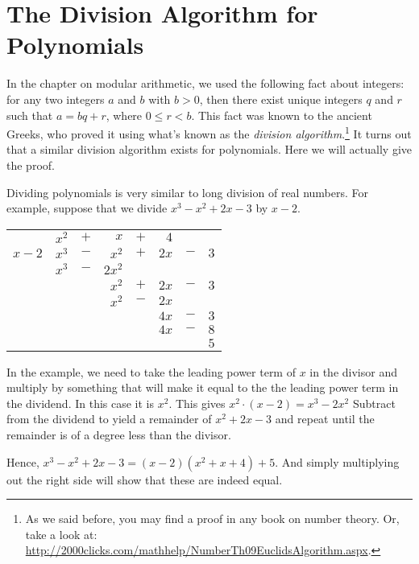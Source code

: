 \section{The Division Algorithm for Polynomials}
In the chapter on modular arithmetic, we used the following fact about integers: for any two integers $a$ and $b$  with $b > 0$, then there exist unique
integers $q$ and $r$ such that $a = bq+r$, where $0 \leq r < b$. This fact was known to the ancient Greeks, who proved it using what's known as the \emph{division algorithm}.\footnote{As we said before, you may find a proof in any book on number theory. Or, take a look at:  \url{http://2000clicks.com/mathhelp/NumberTh09EuclidsAlgorithm.aspx}.} It turns out that a similar
division algorithm exists for
polynomials. Here we will actually give the proof.

\begin{example}\label{example:poly:poly_division} 
Dividing polynomials is very similar to long division of real numbers.  
 For example,
suppose that we divide $x^3 - x^2 + 2 x - 3$ by $x - 2$.  
\begin{center}
\begin{tabular}{rrcrcrcr}
        &  $x^2$  &  $+$  &      $x$  &  $+$  &    $4$  &       &       \\ \cline{2-8}
 \multicolumn{1}{r|}{$x - 2$}
        &  $x^3$  &  $-$  &    $x^2$  &  $+$  &  $2 x$  &  $-$  &  $3$  \\
        &  $x^3$  &  $-$  &  $2 x^2$  &       &         &       &       \\ \cline{2-8}
        &         &       &    $x^2$  &  $+$  &  $2 x$  &  $-$  &  $3$  \\
        &         &       &    $x^2$  &  $-$  &  $2 x$  &       &       \\ \cline{4-8}
        &         &       &           &       &  $4 x$  &  $-$  &  $3$  \\
        &         &       &           &       &  $4 x$  &  $-$  &  $8$  \\ \cline{6-8}
        &         &       &           &       &         &       &  $5$
\end{tabular}
\end{center}
In the example, we need to take the leading power term of $x$ in the divisor and multiply by something that will make it equal to the the leading power term in the dividend.  In this case it is $x^2$.  This gives $x^2\cdot(x-2) = x^3 - 2x^2$  Subtract from the dividend to yield a remainder of $x^2 + 2x - 3$ and repeat until the remainder is of a degree less than the divisor.
 
Hence, $x^3 - x^2 + 2 x - 3 = (x - 2) (x^2 + x + 4 ) + 5$.  And simply multiplying out the right side will show that these are indeed equal.
\end{example}

